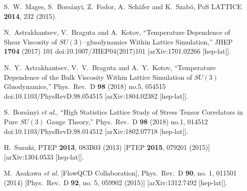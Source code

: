 \documentclass[a4paper,11pt]{article}
\begin{document}
\begin{thebibliography}{99}
  S.~W.~Mages, S.~Bors\'{a}nyi, Z.~Fodor, A.~Sch\"{a}fer and K.~Szab\'{o},
  PoS LATTICE {\bf 2014}, 232 (2015).


  N.~Astrakhantsev, V.~Braguta and A.~Kotov,
  ``Temperature Dependence of Shear Viscosity of $SU(3)$--gluodynamics Within Lattice Simulation,''
  JHEP {\bf 1704} (2017) 101
  doi:10.1007/JHEP04(2017)101
  [arXiv:1701.02266 [hep-lat]].






  N.~Y.~Astrakhantsev, V.~V.~Braguta and A.~Y.~Kotov,
  ``Temperature Dependence of the Bulk Viscosity Within Lattice Simulation of $SU(3)$ Gluodynamics,''
  Phys.\ Rev.\ D {\bf 98} (2018) no.5,  054515
  doi:10.1103/PhysRevD.98.054515
  [arXiv:1804.02382 [hep-lat]].



  S.~Bors\'{a}nyi {\it et al.},
  ``High Statistics Lattice Study of Stress Tensor Correlators in Pure $SU(3)$ Gauge Theory,''
  Phys.\ Rev.\ D {\bf 98} (2018) no.1,  014512
  doi:10.1103/PhysRevD.98.014512
  [arXiv:1802.07718 [hep-lat]].



  


  H.~Suzuki,
  PTEP {\bf 2013}, 083B03 (2013)
  [PTEP {\bf 2015}, 079201 (2015)]
  [arXiv:1304.0533 [hep-lat]].


  M.~Asakawa {\it et al.} [FlowQCD Collaboration],
  Phys.\ Rev.\ D {\bf 90}, no. 1, 011501 (2014)
  [Phys.\ Rev.\ D {\bf 92}, no. 5, 059902 (2015)]
  [arXiv:1312.7492 [hep-lat]].





\end{thebibliography}
\end{document}

